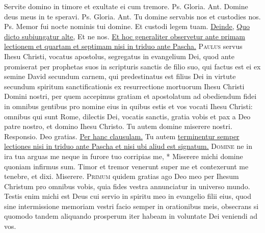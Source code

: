 \begin{multicols*}{2}
 Servite domino in timore et exultate ei cum tremore. {\color{Red} Ps.}     Gloria. {\color{Red} Ant.} Domine deus meus in te speravi. {\color{Red} Ps.}     Gloria. {\color{Red} Ant.} Tu domine servabis nos et custodies nos. {\color{Red} Ps.}     \V Memor fui nocte nominis tui domine. \R Et custodi legem tuam. \ul{Deinde,}  \ul{Quo dicto subiungatur alte,} Et ne nos. \ul{Et hoc generaliter observetur ante primam lectionem et quartam et septimam nisi in triduo ante Pascha.}
\lettrine[lines=2]{\zallmancaps \color{Blue} P}{aulus} servus Ihesu Christi, vocatus apostolus, segregatus in evangelium Dei, quod ante promiserat per prophetas suos in scripturis sanctis de filio suo, qui factus est ei ex semine David secundum carnem, qui predestinatus est filius Dei in virtute secundum spiritum sanctificationis ex resurrectione mortuorum Ihesu Christi Domini nostri, per quem accepimus gratiam et apostolatum ad obediendum fidei in omnibus gentibus pro nomine eius in quibus estis et vos vocati Ihesu Christi: omnibus qui sunt Rome, dilectis Dei, vocatis sanctis, gratia vobis et pax a Deo patre nostro, et domino Ihesu Christo. Tu autem domine miserere nostri. {\color{Red} Responsio.} Deo gratias. \ul{Per hanc clausulam.} Tu autem \ul{terminentur semper lectiones nisi in triduo ante Pascha et nisi ubi aliud est signatum.}
\lettrine[lines=2]{\zallmancaps \color{Red} D}{omine} \hypertarget{domine-ne-in-ira}{\label{domine-ne-in-ira}} ne in ira tua arguas me neque in furore tuo corripias me, * Miserere michi domine quoniam infirmus sum. \V Timor et tremor venerunt super me et contexerunt me tenebre, et dixi. Miserere.
\lettrine[lines=2]{\zallmancaps \color{Blue} P}{rimum} quidem gratias ago Deo meo per Ihesum Christum pro omnibus vobis, quia fides vestra annunciatur in universo mundo. Testis enim michi est Deus cui servio in spiritu meo in evangelio filii eius, quod sine intermissione memoriam vestri facio semper in orationibus meis, obsecrans si quomodo tandem aliquando prosperum iter habeam in voluntate Dei veniendi ad vos.

\end{multicols*}
